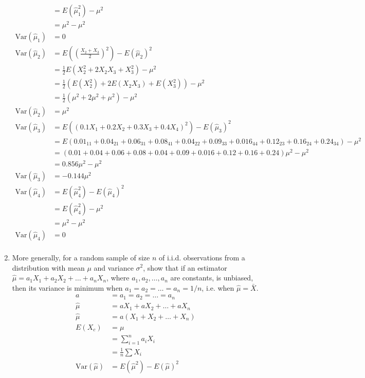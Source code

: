 \documentclass{article}
\newcommand{\fh}{\tfrac{1}{2}}
\newcommand{\var}{\text{Var}}
\begin{document}
\begin{enumerate}[\quad(a)]
\begin{align*}
			&= E(\hat{\mu}_1^2) - \mu^2\\
			&= \mu^2 - \mu^2\\
			\var(\hat{\mu}_1) &= 0\\
			\var(\hat{\mu}_2) &= E\left(\left(\frac{X_2 + X_3}{2}\right)^2\right) - E(\hat{\mu}_2)^2\\
			&= \fh E(X_2^2 + 2X_2X_3 + X_3^2) - \mu^2\\
			&= \fh \left( E(X_2^2) + 2 E(X_2X_3) + E(X_3^2) \right) - \mu^2\\
			&= \fh \left( \mu^2 + 2\mu^2 + \mu^2 \right) - \mu^2 \\
			\var(\hat{\mu}_2) &= \mu^2\\
			\var(\hat{\mu}_3) &= E\left((0.1X_1 + 0.2 X_2 + 0.3 X_3 + 0.4 X_4) ^2\right) - E(\hat{\mu}_3)^2\\
			&= E(0.01_{11} +  0.04_{21} + 0.06_{31} + 0.08_{41} + 0.04_{22} + 0.09_{33} + 0.016_{44} + 0.12_{23} + 0.16_{24} + 0.24_{34}) - \mu^2\\
			&= (0.01 +  0.04 + 0.06 + 0.08 + 0.04 + 0.09 + 0.016 + 0.12 + 0.16 + 0.24)\mu^2 - \mu^2\\
			&= 0.856\mu^2 - \mu^2\\
			\var(\hat{\mu}_3) &= -0.144\mu^2\\
			\var(\hat{\mu}_4) &= E(\hat{\mu}_4^2) - E(\hat{\mu}_4)^2\\
			&= E(\hat{\mu}_4^2) - \mu^2\\
			&= \mu^2 - \mu^2\\
			\var(\hat{\mu}_4) &= 0\\
		\end{align*}
		\newpage
		\item More generally, for a random sample of size $n$ of i.i.d. observations from a distribution with mean $\mu$ and variance $\sigma^2$, show that if an estimator $\hat{\mu} = a_1X_1 + a_2X_2 + \ldots + a_nX_n$, where $a_1, a_2, \dots, a_n$ are constants, is unbiased, then its variance is minimum when $a_1 = a_2 = \ldots = a_n = 1/n$, i.e. when $\hat{\mu} = \bar{X}$.
		\begin{align*}
			a &= a_1 = a_2 = \ldots = a_n\\
			\hat{\mu} &= aX_1 + aX_2 + \ldots + aX_n\\
			\hat{\mu} &= a(X_1 + X_2 + \ldots + X_n)\\
			E(X_c)  &= \mu\\
			&= \sum_{i=1}^n a_i X_i\\
			&= \tfrac{1}{n} \sum X_i\\
			\var(\hat{\mu}) &= E(\hat{\mu}^2) - E(\hat{\mu})^2\\

\end{align*}
\end{enumerate}
\end{document}
